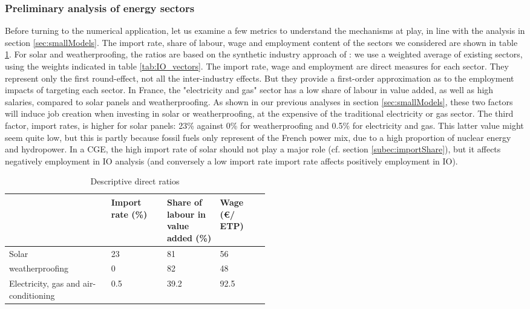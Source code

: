 \subsubsection{Preliminary analysis of energy sectors}
Before turning to the numerical application, let us examine a few metrics to understand the mechanisms at play, in line with the analysis in section \ref{sec:smallModels}. The import rate, share of labour, wage and employment content of the sectors we considered are shown in table \ref{tab:descriptiveRatios}. 
For solar and weatherproofing, the ratios are based on the synthetic industry approach of \citet{Garrett2017}: we use a weighted average of existing sectors, using the weights indicated in table \ref{tab:IO_vectors}.
The import rate, wage and employment are direct measures for each sector. They represent only the first round-effect, not all the inter-industry effects. But they provide a first-order approximation as to the employment impacts of targeting each sector.
In France, the "electricity and gas" sector has a low share of labour in value added, as well as high salaries, compared to solar panels and weatherproofing. As shown in our previous analyses in section \ref{sec:smallModels}, these two factors will induce job creation when investing in solar or weatherproofing, at the expensive of the traditional electricity or gas sector.
The third factor, import rates, is higher for solar panels: 23\% against 0\% for weatherproofing and 0.5\% for electricity and gas. This latter value might seem quite low, but this is partly because fossil fuels only represent of the French power mix, due to a high proportion of nuclear energy and hydropower. In a CGE, the high import rate of solar should not play a major role (cf. section \ref{subec:importShare}), but it affects negatively employment in IO analysis (and conversely a low import rate import rate affects positively employment in IO).

\begin{table}[!h]
	\centering
	\caption{Descriptive direct ratios}
	\label{tab:descriptiveRatios}
	\begin{tabular}{p{0.2\linewidth}p{0.1\linewidth}p{0.1\linewidth}p{0.1\linewidth}}
		\toprule
		& Import rate (\%) & Share of labour in value added (\%) & Wage (\euro / ETP)  \\
		\midrule
		Solar & 23 & 81 & 56 \\
		weatherproofing & 0 & 82 & 48 \\
		Electricity, gas and air-conditioning & 0.5 & 39.2 & 92.5 \\
		\bottomrule
	\end{tabular}
\end{table}


